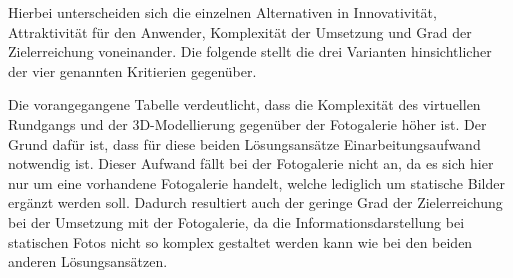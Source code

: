 Hierbei unterscheiden sich die einzelnen Alternativen in Innovativität,
Attraktivität für den Anwender, Komplexität der Umsetzung und Grad der Zielerreichung voneinander.
Die folgende  stellt die drei Varianten
hinsichtlicher der vier genannten Kritierien gegenüber.

% 


Die vorangegangene Tabelle verdeutlicht, dass die Komplexität des virtuellen Rundgangs und der 3D-Modellierung gegenüber 
der Fotogalerie höher ist. Der Grund dafür ist, dass für diese beiden Lösungsansätze Einarbeitungsaufwand notwendig ist. 
Dieser Aufwand fällt bei der Fotogalerie nicht an, da es sich hier nur um eine vorhandene Fotogalerie handelt, welche 
lediglich um statische Bilder ergänzt werden soll. Dadurch resultiert auch der geringe Grad der Zielerreichung bei der 
Umsetzung mit der Fotogalerie, da die Informationsdarstellung bei statischen Fotos nicht so komplex gestaltet werden kann 
wie bei den beiden anderen Lösungsansätzen.



